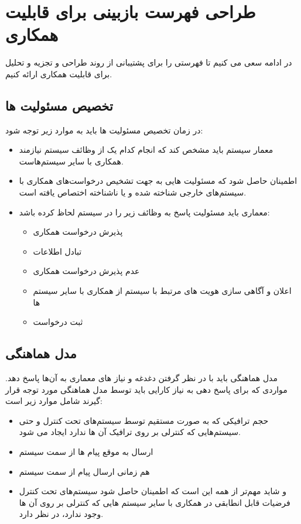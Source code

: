 \section{طراحی فهرست بازبینی برای قابلیت همکاری}

در ادامه سعی می کنیم تا فهرستی را برای پشتیبانی از روند طراحی و تجزیه و تحلیل برای قابلیت همکاری ارائه کنیم.


\subsection{تخصیص مسئولیت ها} 
در زمان تخصیص مسئولیت ها باید  به موارد زیر توجه شود:
\begin{itemize}
\item
معمار سیستم باید مشخص کند که انجام کدام یک از وظائف سیستم نیازمند همکاری با سایر سیستم‌هاست.
\item
اطمینان حاصل شود که مسئولیت هایی به جهت تشخیص درخواست‌های همکاری با سیستم‌های خارجی شناخته شده و یا ناشناخته اختصاص یافته است.
\item
معماری باید مسئولیت پاسخ به وظائف زیر را در سیستم لحاظ کرده باشد:
\begin{itemize}
\item
پذیرش درخواست همکاری
\item
تبادل اطلاعات
\item
عدم پذیرش درخواست همکاری
\item
اعلان و آگاهی سازی هویت های مرتبط با سیستم از همکاری با سایر سیستم ها
\item
ثبت درخواست
\end{itemize}
\end{itemize}

\subsection{مدل هماهنگی}
مدل هماهنگی باید با در نظر گرفتن دغدغه و نیاز های معماری به آن‌ها پاسخ دهد. مواردی که برای پاسخ دهی به نیاز کارایی باید توسط مدل هماهنگی مورد توجه قرار گیرند شامل موارد زیر است:
\begin{itemize}
\item
حجم ترافیکی که به صورت مستقیم توسط سیستم‌های تحت کنترل و حتی سیستم‌هایی که کنترلی بر روی ترافیک آن ها ندارد ایجاد می شود.
\item
ارسال به موقع پیام ها از سمت سیستم
\item
هم زمانی ارسال پیام از سمت سیستم
\item
و شاید مهم‌تر از همه این است که اطمینان حاصل شود سیستم‌های تحت کنترل فرضیات قابل انطابقی در همکاری با سایر سیستم هایی که کنترلی بر روی آن ها وجود ندارد، در نظر دارد.
\end{itemize}


